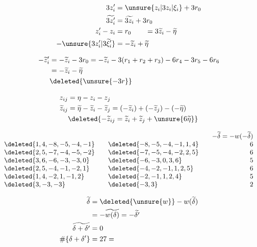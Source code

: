 \[
\begin{aligned}
3z'_i&=\unsure{z_i|3z_i|\xi_i}+3r_0\\
\widetilde{3z'_i}&=\widetilde{3z_i}+3r_0\\
z'_i-z_i&=r_0\qquad=3\widetilde z_i-\widetilde\eta\\
-\unsure{3z'_i|3\widetilde{\xi}'_i}&=-\widetilde z_i+\widetilde\eta
\end{aligned}
\]

\[
\begin{aligned}
-\widetilde z'_i&=-\widetilde z_i-3r_0
=-\widetilde z_i-3(r_1+r_2+r_3)-6r_4-3r_5-6r_6\\
&=-\widetilde z_i-\widetilde\eta\\
&\deleted{\unsure{-3r}}
\end{aligned}
\]

\[
\begin{aligned}
z_{ij}&=\eta-z_i-z_j\\
\widetilde z_{ij}&=\widetilde\eta-\widetilde z_i-\widetilde z_j
=(-\widetilde z_i)+(-\widetilde z_j)-(-\widetilde\eta)\\
&\deleted{-\widetilde z_{ij}=\widetilde z_i+\widetilde z_j+\unsure{6\widetilde\eta}}
\end{aligned}
\]


\[
\begin{array}{l@{\qquad}l@{\qquad}r}
&&-\widetilde\delta=-w(-\widetilde\delta)\\
\deleted{1,4,-8,-5,-4,-1}&\deleted{-8,-5,-4,-1,1,4}&6\\
\deleted{2,5,-7,-4,-5,-2}&\deleted{-7,-5,-4,-2,2,5}&6\\
\deleted{3,6,-6,-3,-3,0}&\deleted{-6,-3,0,3,6}&5\\
\deleted{2,5,-4,-1,-2,1}&\deleted{-4,-2,-1,1,2,5}&6\\
\deleted{1,4,-2,1,-1,2}&\deleted{-2,-1,1,2,4}&5\\
\deleted{3,-3,-3}&\deleted{-3,3}&2
\end{array}
\]

\[
\begin{aligned}
\widetilde\delta&=\deleted{\unsure{w}}-w(\widetilde\delta)\\
&=-\widetilde{w(\delta)}=-\widetilde{\delta'}\\
\widetilde{\delta+\delta'}&=0\\
\#\{\delta+\delta'\}&=27=
\end{aligned}
\]

